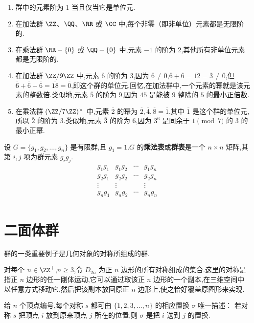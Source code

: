 \begin{example}
	\begin{enumerate}[label=(\arabic*)]
		\item 群中的元素阶为 $1$ 当且仅当它是单位元.
		\item 在加法群 $\ZZ$、$\QQ$、$\RR$ 或 $\CC$ 中,每个非零（即非单位）元素都是无限阶的.
		\item 在乘法群 $\RR-\{0\}$ 或 $\QQ-\{0\}$ 中,元素 $-1$ 的阶为 $2$,其他所有非单位元素都是无限阶的.
		\item 在加法群 $\ZZ/9\ZZ$ 中,元素 $\overline{6}$ 的阶为 $3$,因为 $\overline{6}\neq\overline{0}$,$\overline{6}+\overline{6}=\overline{12}=\overline{3}\neq\overline{0}$,但 $\overline{6}+\overline{6}+\overline{6}=\overline{18}=\overline{0}$,即这个群的单位元.回忆,在加法群中,一个元素的幂就是该元素的整数倍.类似地,元素 $\overline{5}$ 的阶为 $9$,因为 $45$ 是能被 $9$ 整除的 $5$ 的最小正倍数.
		\item 在乘法群 $(\ZZ/7\ZZ)^\times$ 中,元素 $\overline{2}$ 的幂为 $\overline{2},\overline{4},\overline{8}=\overline{1}$,其中 $\overline{1}$ 是这个群的单位元,所以 $\overline{2}$ 的阶为 $3$.类似地,元素 $\overline{3}$ 的阶为 $6$,因为 $3^6$ 是同余于 $1\pmod 7$ 的 $3$ 的最小正幂.
	\end{enumerate}
	
\end{example}
\begin{definition}
	设 $G=\{g_1,g_2,\ldots,g_n\}$ 是有限群,且 $g_1=1$.$G$ 的\textbf{乘法表}或\textbf{群表}是一个 $n\times n$ 矩阵,其第 $i,j$ 项为群元素 $g_ig_j$.
	\[\begin{matrix}
		g_1g_1&g_1g_2&\cdots&g_1g_n\\
		g_2g_1&g_2g_2&\cdots&g_2g_n\\
		\vdots&\vdots&&\vdots\\
		g_ng_1&g_ng_2&\cdots&g_ng_n\\
	\end{matrix}\]
\end{definition}
\section{二面体群}
群的一类重要例子是几何对象的对称所组成的群.
\begin{definition}
	对每个 $n\in\ZZ^+$,$n\geq3$,令 $D_{2n}$ 为正 $n$ 边形的所有对称组成的集合.这里的对称是指正 $n$ 边形的任一刚体运动,它可以通过取该正 $n$ 边形的一个副本,在三维空间中以任意方式移动它,然后把该副本放回原正 $n$ 边形上,使之恰好覆盖原图形来实现.
\end{definition}
给 $n$ 个顶点编号,每个对称 $s$ 都可由 $\{1,2,3,\ldots,n\}$ 的相应置换 $\sigma$ 唯一描述：
若对称 $s$ 把顶点 $i$ 放到原来顶点 $j$ 所在的位置,则 $\sigma$ 是把 $i$ 送到 $j$ 的置换.


